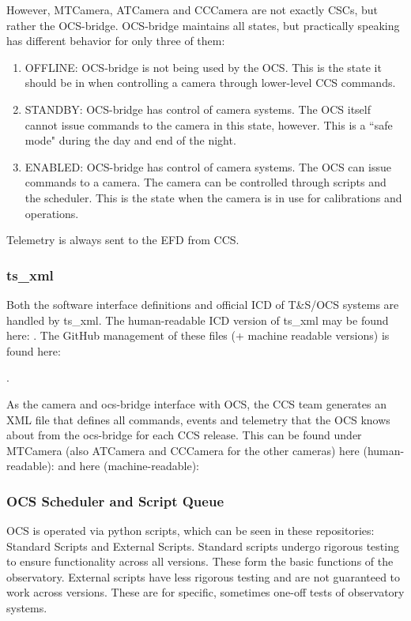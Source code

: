 However, MTCamera, ATCamera and CCCamera are not exactly CSCs, but rather the OCS-bridge. OCS-bridge maintains all states, but practically speaking has different behavior for only three of them: 
\begin{enumerate}
    \item OFFLINE: OCS-bridge is not being used by the OCS. This is the state it should be in when controlling a camera through lower-level CCS commands.
    \item STANDBY: OCS-bridge has control of camera systems. The OCS itself cannot issue commands to the camera in this state, however. This is a ``safe mode" during the day and end of the night.
    \item ENABLED: OCS-bridge has control of camera systems. The OCS can issue commands to a camera. The camera can be controlled through scripts and the scheduler. This is the state when the camera is in use for calibrations and operations.
\end{enumerate}
Telemetry is always sent to the EFD from CCS.

\subsubsection{ts\_xml}
Both the software interface definitions and official ICD of T\&S/OCS systems are handled by ts\_xml. The human-readable ICD version of ts\_xml may be found here: . The GitHub management of these files (+ machine readable versions) is found here: 

 . 

As the camera and ocs-bridge interface with OCS, the CCS team generates an XML file that defines all commands, events and telemetry that the OCS knows about from the ocs-bridge for each CCS release. This can be found under MTCamera (also ATCamera and CCCamera for the other cameras) here (human-readable): 
  and here (machine-readable):  

\subsubsection{OCS Scheduler and Script Queue}
OCS is operated via python scripts, which can be seen in these repositories: Standard Scripts and External Scripts. Standard scripts undergo rigorous testing to ensure functionality across all versions. These form the basic functions of the observatory. External scripts have less rigorous testing and are not guaranteed to work across versions. These are for specific, sometimes one-off tests of observatory systems.

